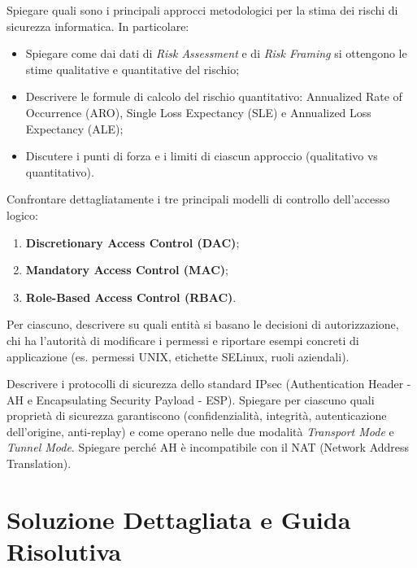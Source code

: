 \documentclass[11pt,a4paper]{article}
\begin{document}
\begin{questionbox}
Spiegare quali sono i principali approcci metodologici per la stima dei rischi di sicurezza informatica. In particolare:
\begin{itemize}
    \item Spiegare come dai dati di \textit{Risk Assessment} e di \textit{Risk Framing} si ottengono le stime qualitative e quantitative del rischio;
    \item Descrivere le formule di calcolo del rischio quantitativo: Annualized Rate of Occurrence (ARO), Single Loss Expectancy (SLE) e Annualized Loss Expectancy (ALE);
    \item Discutere i punti di forza e i limiti di ciascun approccio (qualitativo vs quantitativo).
\end{itemize}
\end{questionbox}

\begin{questionbox}
Confrontare dettagliatamente i tre principali modelli di controllo dell'accesso logico:
\begin{enumerate}[label=\alph*.]
    \item \textbf{Discretionary Access Control (DAC)};
    \item \textbf{Mandatory Access Control (MAC)};
    \item \textbf{Role-Based Access Control (RBAC)}.
\end{enumerate}
Per ciascuno, descrivere su quali entit\`a si basano le decisioni di autorizzazione, chi ha l'autorit\`a di modificare i permessi e riportare esempi concreti di applicazione (es. permessi UNIX, etichette SELinux, ruoli aziendali).
\end{questionbox}

\begin{questionbox}
Descrivere i protocolli di sicurezza dello standard IPsec (Authentication Header - AH e Encapsulating Security Payload - ESP). Spiegare per ciascuno quali propriet\`a di sicurezza garantiscono (confidenzialit\`a, integrit\`a, autenticazione dell'origine, anti-replay) e come operano nelle due modalit\`a \textit{Transport Mode} e \textit{Tunnel Mode}. Spiegare perch\'e AH \`e incompatibile con il NAT (Network Address Translation).
\end{questionbox}

\newpage
\section{Soluzione Dettagliata e Guida Risolutiva}
\end{document}
